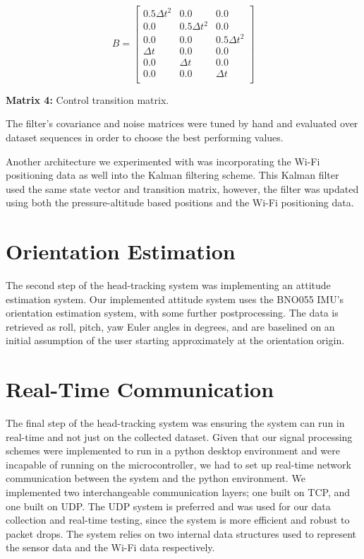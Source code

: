 \[
B =
\begin{bmatrix}
0.5\Delta t^2 & 0.0 & 0.0 \\
0.0 & 0.5\Delta t^2 & 0.0 \\
0.0 & 0.0 & 0.5\Delta t^2 \\
\Delta t & 0.0 & 0.0 \\
0.0 & \Delta t & 0.0 \\
0.0 & 0.0 & \Delta t \\
\end{bmatrix}
\]
\begin{center}
\textbf{Matrix 4:} Control transition matrix.
\end{center}

\par
The filter's covariance and noise matrices were tuned by hand and evaluated over dataset sequences in order to choose the best performing values.
\par
Another architecture we experimented with was incorporating the Wi-Fi positioning data as well into the Kalman filtering scheme. This Kalman filter used the same state vector and transition matrix, however, the filter was updated using both the pressure-altitude based positions and the Wi-Fi positioning data.

\section{Orientation Estimation}
The second step of the head-tracking system was implementing an attitude estimation system. Our implemented attitude system uses the BNO055 IMU's orientation estimation system, with some further postprocessing. The data is retrieved as roll, pitch, yaw Euler angles in degrees, and are baselined on an initial assumption of the user starting approximately at the orientation origin. \cite{bno}

\section{Real-Time Communication}
The final step of the head-tracking system was ensuring the system can run in real-time and not just on the collected dataset. Given that our signal processing schemes were implemented to run in a python desktop environment and were incapable of running on the microcontroller, we had to set up real-time network communication between the system and the python environment. We implemented two interchangeable communication layers; one built on TCP, and one built on UDP. The UDP system is preferred and was used for our data collection and real-time testing, since the system is more efficient and robust to packet drops. The system relies on two internal data structures used to represent the sensor data and the Wi-Fi data respectively.
\par

